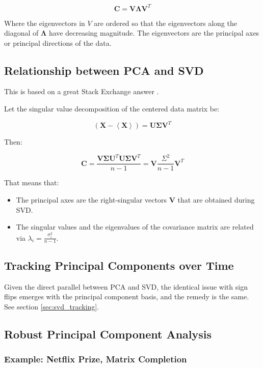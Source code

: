 \begin{equation}
\mathbf{C} = \mathbf{V}\mathbf{\Lambda}\mathbf{V}^T
\end{equation}

Where the eigenvectors in $V$ are ordered so that the eigenvectors along the diagonal of $\mathbf{\Lambda}$ have decreasing magnitude. The eigenvectors are the principal axes or principal directions of the data.


\subsection{Relationship between PCA and SVD}
\label{sec:pcasvd}
This is based on a great Stack Exchange answer \cite{amoeba2015svdpca}.

Let the singular value decomposition of the centered data matrix be:

\begin{equation}
\left(\mathbf{X}-\left<\mathbf{X}\right>\right) = \mathbf{U}\mathbf{\Sigma}\mathbf{V}^T
\end{equation}

Then:

\begin{equation}
\mathbf{C} = \frac{\mathbf{V\Sigma U}^T\mathbf{U\Sigma V}^T}{n-1} = \mathbf{V}\frac{\Sigma^2}{n-1}\mathbf{V}^T
\end{equation}

That means that:

\begin{itemize}
\item The principal axes are the right-singular vectors $\mathbf{V}$ that are obtained during SVD.
\item The singular values and the eigenvalues of the covariance matrix are related via $\lambda_i = \frac{\sigma_i^2}{n-1}$.
\end{itemize}



\subsection{Tracking Principal Components over Time}
Given the direct parallel between PCA and SVD, the identical issue with sign flips emerges with the principal component basis, and the remedy is the same. See section \ref{sec:svd_tracking}.


\subsection{Robust Principal Component Analysis}

\subsubsection{Example: Netflix Prize, Matrix Completion}
